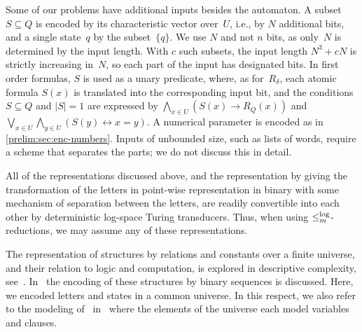 Some of our problems have additional inputs besides the automaton.
A subset $S \subseteq Q$ is encoded by its characteristic vector over~$U$,
i.e., by $N$ additional bits, and a single state~$q$ by the subset~$\{q\}$.
We use $N$ and not $n$ bits, as only~$N$ is determined by the input length.
With $c$ such subsets, the input length $N^3 + cN$ is strictly increasing in~$N$,
so each part of the input has designated bits.
In first order formulas, $S$ is used as a unary predicate,
where, as for~$R_{\delta}$, each atomic formula $S(x)$ is translated into the corresponding input bit,
and the conditions $S \subseteq Q$ and $|S| = 1$ are expressed by
$\bigwedge_{x \in U} ( S(x) \rightarrow R_Q(x) )$
and $\bigvee_{x \in U} \bigwedge_{y \in U} ( S(y) \leftrightarrow x = y )$.
A numerical parameter is encoded as in \cref{prelim:sec:enc-numbers}.
Inputs of unbounded size, such as lists of words, require a scheme that separates the parts; we do not discuss this in detail.


\begin{remark}
	All of the representations discussed above, 
	and the representation by giving the transformation of the letters in point-wise representation in binary
	with some mechanism of separation between the letters,
	are readily convertible into each other by deterministic log-space Turing transducers.
	Thus, when using $\le_m^{\log}$-reductions, we may assume any of these representations.
\end{remark}

\begin{remark}
	The representation of structures
	by relations and constants over a finite universe, 
	and their relation to logic and computation,
	is explored in descriptive complexity,
	see~\cite{DBLP:books/daglib/0095988}.
	In~\cite[Def.~2.1]{DBLP:books/daglib/0095988}
	the encoding of these structures by binary sequences is discussed.
	Here, we encoded letters and states in a common universe.
	In this respect, we also refer to the modeling of \SAT\  in~\cite[Ex.~2.18]{DBLP:books/daglib/0095988} 
	where the elements of the universe each model variables and clauses.	
\end{remark}